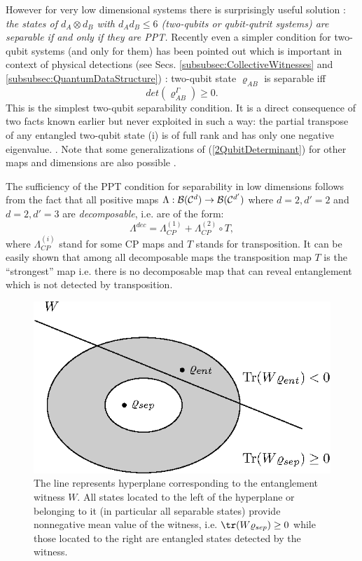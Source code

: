 \documentclass[twocolumn,aps,rmp]{revtex4}
\begin{document}
However for very low dimensional systems there is surprisingly useful
solution \cite{sep1996}: {\it the states of $d_{A} \otimes d_{B} $
  with $d_{A}d_{B}\leq 6$ (two-qubits or qubit-qutrit systems) are
  separable if and only if they are PPT.} Recently even a simpler
condition for two-qubit systems (and only for them) has been pointed
out \cite{Augusiak} which is important in context of physical
detections (see Secs. \ref{subsubsec:CollectiveWitnesses} and
\ref{subsubsec:QuantumDataStructure}) : two-qubit state $\varrho_{AB}$
is separable iff
\begin{equation}
det(\varrho_{AB}^{\Gamma})\geq 0 \label{2QubitDeterminant}.
\end{equation}
This is the simplest two-qubit separability condition. It is a direct
consequence of two facts known earlier but never exploited in such a
way: the partial transpose of any entangled two-qubit state (i) is of
full rank and has only one negative eigenvalue.
\cite{SanperaTarrachVidal,Verstraete(i-ii)}. Note that some
generalizations of (\ref{2QubitDeterminant}) for other maps and
dimensions are also possible \cite{Augusiak}.

The sufficiency of the PPT condition for separability in low
dimensions follows from the fact \cite{Stoermer,Woronowicz} that all
positive maps $\Lambda:{\cal B}({\cal C}^{d}) \rightarrow {\cal
  B}({\cal C}^{d'}) $ where $d=2,d'=2$ and $d=2,d'=3$ are {\it
  decomposable}, i.e. are of the form:
\begin{equation}
\Lambda^{dec}=\Lambda_{CP}^{(1)} + \Lambda_{CP}^{(2)} \circ T,
\label{decomposablemap}
\end{equation}
where $\Lambda_{CP}^{(i)}$ stand for some CP maps and $T$ stands for
transposition. It can be easily shown \cite{sep1996} that among all
decomposable maps the transposition map $T$ is the ``strongest'' map
i.e. there is no decomposable map that can reveal entanglement which
is not detected by transposition.

\begin{figure}
  \centering
  \includegraphics{fig-witness}
  \caption{The line represents hyperplane corresponding to the
    entanglement witness $W$. All states located to the left of the
    hyperplane or belonging to it (in particular all separable states)
    provide nonnegative mean value of the witness,
    i.e. ${\tr}(W\varrho_{sep}) \ge 0$ while those located to the
    right are entangled states detected by the witness.}
  \label{fig:witness}
\end{figure}
\end{document}
